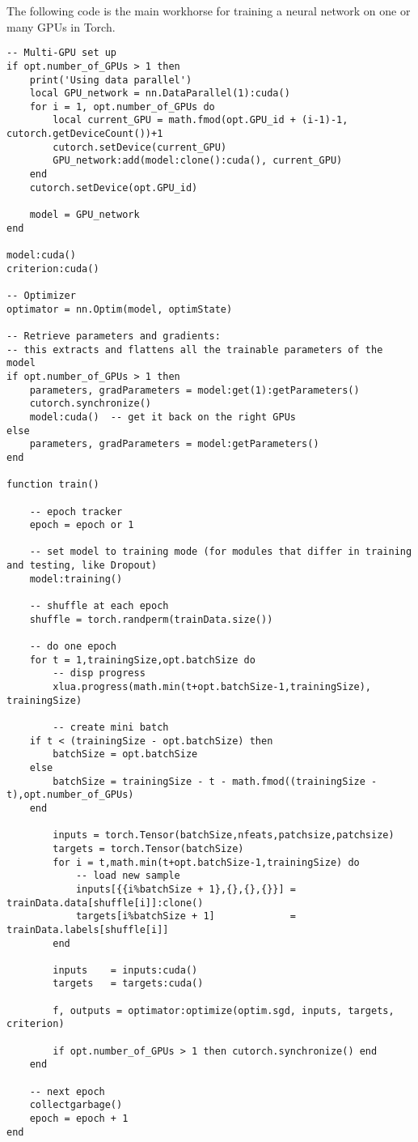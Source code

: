\begin{appendices}
\newpage 

\noindent The following code is the main workhorse for training a neural network on one or many GPUs in Torch.\\

\begin{lstlisting}
-- Multi-GPU set up
if opt.number_of_GPUs > 1 then
    print('Using data parallel')
    local GPU_network = nn.DataParallel(1):cuda()
    for i = 1, opt.number_of_GPUs do
        local current_GPU = math.fmod(opt.GPU_id + (i-1)-1, cutorch.getDeviceCount())+1
        cutorch.setDevice(current_GPU)
        GPU_network:add(model:clone():cuda(), current_GPU)
    end
    cutorch.setDevice(opt.GPU_id)

    model = GPU_network
end

model:cuda()
criterion:cuda()

-- Optimizer
optimator = nn.Optim(model, optimState)

-- Retrieve parameters and gradients:
-- this extracts and flattens all the trainable parameters of the model
if opt.number_of_GPUs > 1 then
    parameters, gradParameters = model:get(1):getParameters()
    cutorch.synchronize()
    model:cuda()  -- get it back on the right GPUs
else
    parameters, gradParameters = model:getParameters()
end

function train()

    -- epoch tracker
    epoch = epoch or 1

    -- set model to training mode (for modules that differ in training and testing, like Dropout)
    model:training()

    -- shuffle at each epoch
    shuffle = torch.randperm(trainData.size())

    -- do one epoch
    for t = 1,trainingSize,opt.batchSize do
        -- disp progress
        xlua.progress(math.min(t+opt.batchSize-1,trainingSize), trainingSize)

        -- create mini batch
	if t < (trainingSize - opt.batchSize) then
		batchSize = opt.batchSize
	else
		batchSize = trainingSize - t - math.fmod((trainingSize - t),opt.number_of_GPUs)
	end

        inputs = torch.Tensor(batchSize,nfeats,patchsize,patchsize)
        targets = torch.Tensor(batchSize)
        for i = t,math.min(t+opt.batchSize-1,trainingSize) do
            -- load new sample
            inputs[{{i%batchSize + 1},{},{},{}}] = trainData.data[shuffle[i]]:clone()
            targets[i%batchSize + 1]             = trainData.labels[shuffle[i]]
        end

        inputs    = inputs:cuda() 
        targets   = targets:cuda()
 	
        f, outputs = optimator:optimize(optim.sgd, inputs, targets, criterion)

        if opt.number_of_GPUs > 1 then cutorch.synchronize() end
    end

    -- next epoch
    collectgarbage()
    epoch = epoch + 1
end
\end{lstlisting}

\end{appendices}